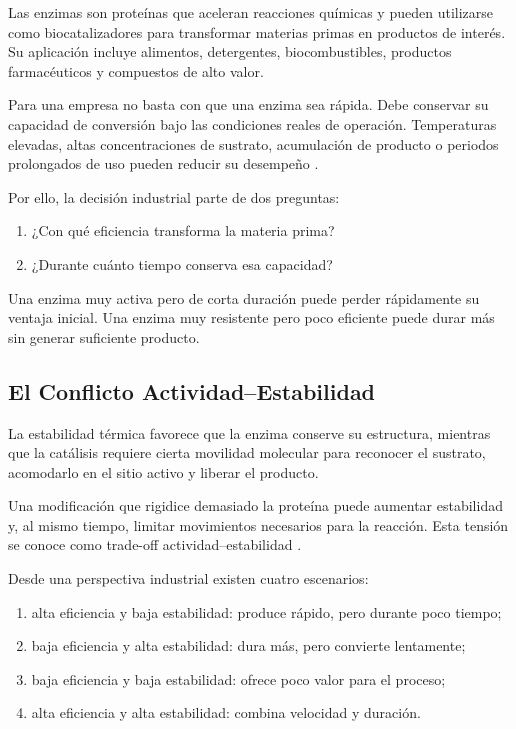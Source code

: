 Las enzimas son proteínas que aceleran reacciones químicas y pueden utilizarse
como biocatalizadores para transformar materias primas en productos de interés.
Su aplicación incluye alimentos, detergentes, biocombustibles, productos
farmacéuticos y compuestos de alto valor.

Para una empresa no basta con que una enzima sea rápida. Debe conservar su
capacidad de conversión bajo las condiciones reales de operación. Temperaturas
elevadas, altas concentraciones de sustrato, acumulación de producto o periodos
prolongados de uso pueden reducir su desempeño
\citep{siddiqui_defying_2017}.

Por ello, la decisión industrial parte de dos preguntas:

\begin{enumerate}
    \item ¿Con qué eficiencia transforma la materia prima?
    \item ¿Durante cuánto tiempo conserva esa capacidad?
\end{enumerate}

Una enzima muy activa pero de corta duración puede perder rápidamente su ventaja
inicial. Una enzima muy resistente pero poco eficiente puede durar más sin
generar suficiente producto.

\subsection{El Conflicto Actividad--Estabilidad}
\label{subsec:tradeoff}

La estabilidad térmica favorece que la enzima conserve su estructura, mientras
que la catálisis requiere cierta movilidad molecular para reconocer el sustrato,
acomodarlo en el sitio activo y liberar el producto.

Una modificación que rigidice demasiado la proteína puede aumentar estabilidad
y, al mismo tiempo, limitar movimientos necesarios para la reacción. Esta
tensión se conoce como trade-off actividad--estabilidad
\citep{hou_tradeoff_2023}.

Desde una perspectiva industrial existen cuatro escenarios:

\begin{enumerate}
    \item alta eficiencia y baja estabilidad: produce rápido, pero durante poco tiempo;
    \item baja eficiencia y alta estabilidad: dura más, pero convierte lentamente;
    \item baja eficiencia y baja estabilidad: ofrece poco valor para el proceso;
    \item alta eficiencia y alta estabilidad: combina velocidad y duración.
\end{enumerate}

